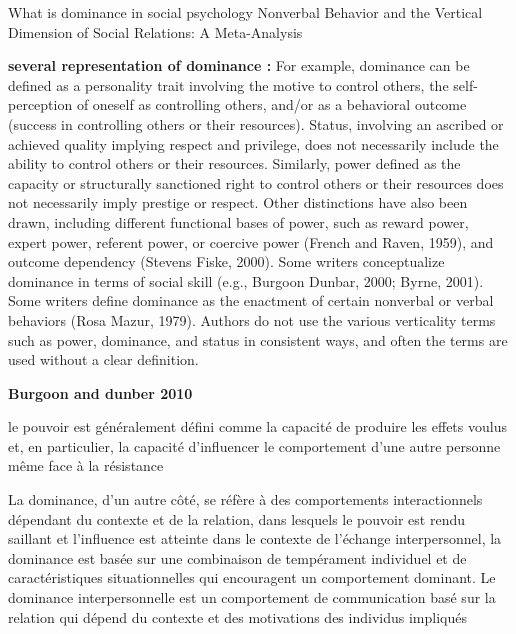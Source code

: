 What is dominance in social psychology
Nonverbal Behavior and the Vertical Dimension of Social Relations: A Meta-Analysis

\textbf{several representation of dominance :} 
For example, dominance can be defined as a personality trait involving the motive to control others, the self-
perception of oneself as controlling others, and/or as a behavioral
outcome (success in controlling others or their resources). Status,
involving an ascribed or achieved quality implying respect and
privilege, does not necessarily include the ability to control others
or their resources. Similarly, power defined as the capacity or
structurally sanctioned right to control others or their resources
does not necessarily imply prestige or respect. Other distinctions
have also been drawn, including different functional bases of
power, such as reward power, expert power, referent power, or
coercive power (French and Raven, 1959), and outcome dependency
(Stevens  Fiske, 2000). Some writers conceptualize dominance
in terms of social skill (e.g., Burgoon  Dunbar, 2000; Byrne,
2001). Some writers define dominance as the enactment of certain
nonverbal or verbal behaviors (Rosa  Mazur, 1979). Authors do
not use the various verticality terms such as power, dominance,
and status in consistent ways, and often the terms are used without
a clear definition.

\textbf{Burgoon and dunber 2010}

le pouvoir est généralement défini comme la capacité de produire les effets voulus et, en particulier, la capacité d'influencer le comportement d'une autre personne même face à la résistance  %


La dominance, d'un autre côté, se réfère à des comportements interactionnels dépendant du contexte et de la relation, dans lesquels le pouvoir est rendu saillant et l'influence est atteinte %
dans le contexte de l'échange interpersonnel, la dominance est basée sur une combinaison de tempérament individuel et de caractéristiques situationnelles qui encouragent un comportement dominant. 
Le dominance interpersonnelle est un comportement de communication basé sur la relation qui dépend du contexte et des motivations des individus impliqués

